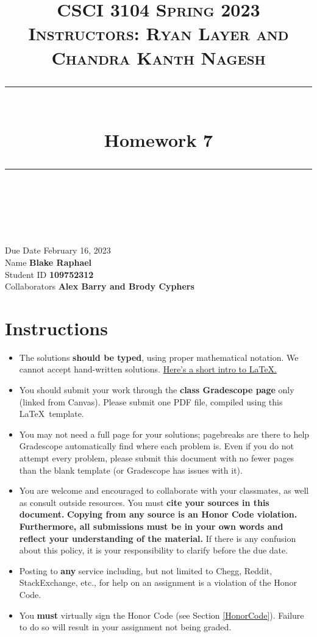 \documentclass[11pt]{article}
\title{
\normalfont \normalsize 
\textsc{CSCI 3104 Spring 2023 \\ 
Instructors: Ryan Layer and Chandra Kanth Nagesh} \\
[10pt] 
\rule{\linewidth}{0.5pt} \\[6pt] 
\huge Homework 7 \\
\rule{\linewidth}{2pt}  \\[10pt]
}
\date{}
\theoremstyle{definition}
\theoremstyle{definition}
\theoremstyle{definition}
\begin{document}

\maketitle


\noindent
Due Date \dotfill February 16, 2023 \\
Name \dotfill \textbf{Blake Raphael} \\
Student ID \dotfill \textbf{109752312} \\
Collaborators \dotfill \textbf{Alex Barry and Brody Cyphers}

\tableofcontents

\section{Instructions}
 \begin{itemize}
	\item The solutions \textbf{should be typed}, using proper mathematical notation. We cannot accept hand-written solutions. \href{http://ece.uprm.edu/~caceros/latex/introduction.pdf}{Here's a short intro to \LaTeX.}
	\item You should submit your work through the \textbf{class Gradescope page} only (linked from Canvas). Please submit one PDF file, compiled using this \LaTeX \ template.
	\item You may not need a full page for your solutions; pagebreaks are there to help Gradescope automatically find where each problem is. Even if you do not attempt every problem, please submit this document with no fewer pages than the blank template (or Gradescope has issues with it).

	\item You are welcome and encouraged to collaborate with your classmates, as well as consult outside resources. You must \textbf{cite your sources in this document.} \textbf{Copying from any source is an Honor Code violation. Furthermore, all submissions must be in your own words and reflect your understanding of the material.} If there is any confusion about this policy, it is your responsibility to clarify before the due date. 

	\item Posting to \textbf{any} service including, but not limited to Chegg, Reddit, StackExchange, etc., for help on an assignment is a violation of the Honor Code.

	\item You \textbf{must} virtually sign the Honor Code (see Section \ref{HonorCode}). Failure to do so will result in your assignment not being graded.
\end{itemize}
\end{document}
